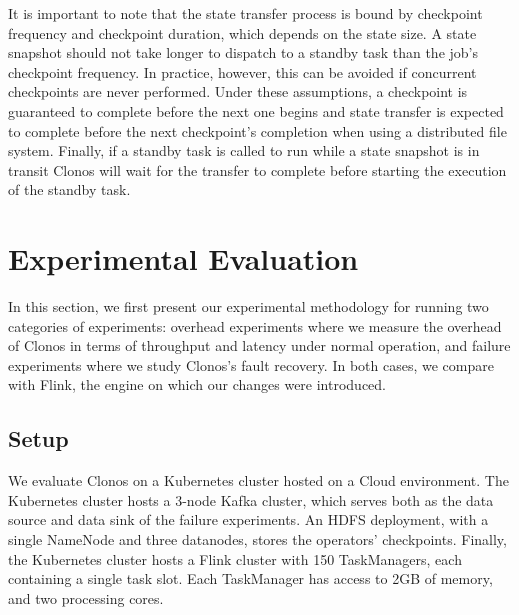 \documentclass[sigconf]{acmart}
\begin{document}
It is important to note that the state transfer process is bound by checkpoint frequency and checkpoint duration, which depends  on the state size.
A state snapshot should not take longer to dispatch to a standby task than the job's checkpoint frequency. 
In practice, however, this can be avoided if concurrent checkpoints are never performed.
Under these assumptions, a checkpoint is guaranteed to complete before the next one begins and state transfer is expected to complete before the next checkpoint's completion when using a distributed file system. 
Finally, if a standby task is called to run while a state snapshot is in transit Clonos will wait for the transfer to complete before starting the execution of the standby task.



\section{Experimental Evaluation}
\label{sec:experiments}

In this section, we first present our experimental methodology for running two categories of experiments: overhead experiments where we measure the overhead of Clonos in terms of throughput and latency under normal operation, and failure experiments where we study Clonos's fault recovery. In both cases, we compare with Flink, the engine on which our changes were introduced.%





\subsection{Setup}
\label{sub:experimental-method}

We evaluate Clonos on a Kubernetes cluster hosted on a Cloud environment. The Kubernetes cluster hosts a 3-node Kafka cluster, which serves both as the data source and data sink of the failure experiments. An HDFS deployment, with a single NameNode and three datanodes, stores the operators' checkpoints. Finally, the  Kubernetes cluster hosts a Flink cluster with 150 TaskManagers, each containing a single task slot. Each TaskManager has access to 2GB of memory, and two processing cores. 
\end{document}
